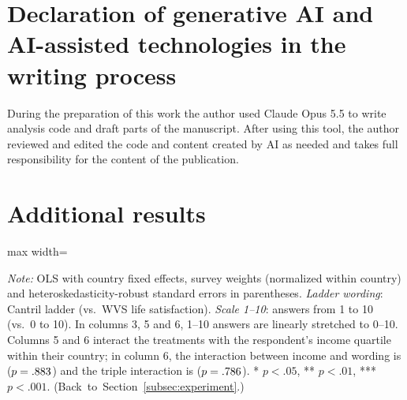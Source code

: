 \documentclass[12pt]{article}
\begin{document}
\section*{Declaration of generative AI and AI-assisted technologies in the writing process}
During the preparation of this work the author used Claude Opus 5.5 to write analysis code and draft parts of the manuscript. After using this tool, the author reviewed and edited the code and content created by AI as needed and takes full responsibility for the content of the publication.



\clearpage
\appendix
\section{Additional results}\label{app:additional}
\renewcommand{\thetable}{A\arabic{table}}
\renewcommand{\thefigure}{A\arabic{figure}}
\setcounter{table}{0}
\setcounter{figure}{0}

\begin{table}[htbp]
    \centering
    \caption{Effects of question wording and scale on life evaluation, Fabre (2025) survey experiment.}\label{tab:fabre_regressions}
    \begin{adjustbox}{max width=\textwidth}
    
    \end{adjustbox}
    \begin{minipage}{\textwidth}\footnotesize \textit{Note:} OLS with country fixed effects, survey weights (normalized within country) and heteroskedasticity-robust standard errors in parentheses. \textit{Ladder wording}: Cantril ladder (vs.\ WVS life satisfaction). \textit{Scale 1--10}: answers from 1 to 10 (vs.\ 0 to 10). In columns 3, 5 and 6, 1--10 answers are linearly stretched to 0--10. Columns 5 and 6 interact the treatments with the respondent's income quartile within their country; in column 6, the interaction between income and wording is \interactionLadderIncomeFull ($p = .883$) and the triple interaction is \tripleInteraction ($p = .786$). * $p<.05$, ** $p<.01$, *** $p<.001$. \hfill(Back~to~Section~\ref{subsec:experiment}.)\end{minipage}
\end{table}
\end{document}
